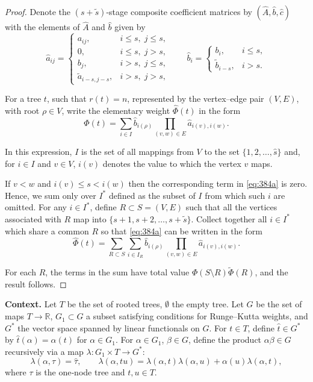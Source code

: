 \begin{theorem}
\begin{proof}
Denote the $(s + \widetilde{s})$-stage composite coefficient matrices by $(\widehat{A}, \widehat{b}, \widehat{c})$ with the elements of $\widehat{A}$ and $\widehat{b}$ given by
\[
\widehat{a}_{ij} =
\begin{cases}
a_{ij}, & i \leq s, \; j \leq s, \\
0, & i \leq s, \; j > s, \\
b_j, & i > s, \; j \leq s, \\
\widetilde{a}_{i-s,j-s}, & i > s, \; j > s,
\end{cases}
\qquad
\widehat{b}_i =
\begin{cases}
b_i, & i \leq s, \\
\widetilde{b}_{i-s}, & i > s.
\end{cases}
\]

For a tree $t$, such that $r(t) = n$, represented by the vertex--edge pair $(V, E)$, with root $\rho \in V$, write the elementary weight $\widehat{\Phi}(t)$ in the form
\[
\widehat{\Phi}(t) = \sum_{i \in I} \widehat{b}_{i(\rho)} \prod_{(v,w) \in E} \widehat{a}_{i(v),i(w)}. \tag{384a}
\]

In this expression, $I$ is the set of all mappings from $V$ to the set $\{1, 2, \dots, \widehat{s}\}$ and, for $i \in I$ and $v \in V$, $i(v)$ denotes the value to which the vertex $v$ maps.

If $v < w$ and $i(v) \leq s < i(w)$ then the corresponding term in \eqref{eq:384a} is zero. Hence, we sum only over $I^*$ defined as the subset of $I$ from which such $i$ are omitted. For any $i \in I^*$, define $R \subset S = (V, E)$ such that all the vertices associated with $R$ map into $\{s + 1, s + 2, \dots, s + \widetilde{s}\}$. Collect together all $i \in I^*$ which share a common $R$ so that \eqref{eq:384a} can be written in the form
\[
\widehat{\Phi}(t) = \sum_{R \subset S} \sum_{i \in I_R} \widehat{b}_{i(\rho)} \prod_{(v,w) \in E} \widehat{a}_{i(v),i(w)}.
\]

For each $R$, the terms in the sum have total value $\Phi(S \setminus R) \widetilde{\Phi}(R)$, and the result follows.
\end{proof}

\noindent\textbf{Context.}
Let $T$ be the set of rooted trees, $\emptyset$ the empty tree. 
Let $G$ be the set of maps $T\to\mathbb{R}$, $G_{1}\subset G$ a subset satisfying conditions for Runge--Kutta weights, and $G^{*}$ the vector space spanned by linear functionals on $G$. 
For $t\in T$, define $\hat{t}\in G^{*}$ by $\hat{t}(\alpha)=\alpha(t)$ for $\alpha\in G_{1}$. 
For $\alpha\in G_{1}$, $\beta\in G$, define the product $\alpha\beta\in G$ recursively via a map $\lambda:G_{1}\times T\to G^{*}$:
\[
\lambda(\alpha,\tau)=\hat{\tau},\qquad 
\lambda(\alpha,tu)=\lambda(\alpha,t)\lambda(\alpha,u)+\alpha(u)\lambda(\alpha,t),
\]
where $\tau$ is the one‑node tree and $t,u\in T$.


\end{theorem}
